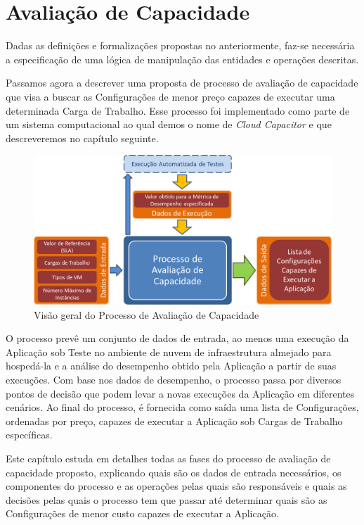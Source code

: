 \chapter[Avaliação de Capacidade]{Avaliação de Capacidade}
Dadas as definições e formalizações propostas no anteriormente, faz-se necessária
a especificação de uma lógica de manipulação das entidades e operações descritas.

Passamos agora a descrever uma proposta de processo de avaliação de capacidade
que visa a buscar as Configurações de menor preço capazes de executar uma determinada 
Carga de Trabalho. Esse processo foi implementado como parte de um sistema 
computacional ao qual demos o nome de \emph{Cloud Capacitor} e que descreveremos 
no capítulo seguinte.  

\begin{figure}[htb]
  \caption{\label{fig_processo_alto_nivel}Visão geral do Processo de Avaliação de Capacidade}
  \begin{center}
    \includegraphics[scale=0.5]{img/processoAltoNivel}
  \end{center}
\end{figure}

O processo prevê um conjunto de dados de entrada, ao menos uma execução da 
Aplicação sob Teste no ambiente de nuvem de infraestrutura almejado para 
hospedá-la e a análise do desempenho obtido pela Aplicação a partir 
de suas execuções. Com base nos dados de desempenho, o processo passa por diversos
pontos de decisão que podem levar a novas execuções da Aplicação em diferentes 
cenários. Ao final do processo, é fornecida como saída uma lista de Configurações, 
ordenadas por preço, capazes de executar a Aplicação sob Cargas de Trabalho específicas.

Este capítulo estuda em detalhes todas as fases do processo de avaliação de capacidade
proposto, explicando quais são os dados de entrada necessários, os componentes do 
processo e as operações pelas quais são responsáveis e quais as decisões pelas quais
o processo tem que passar até determinar quais são as Configurações de menor custo
capazes de executar a Aplicação.

